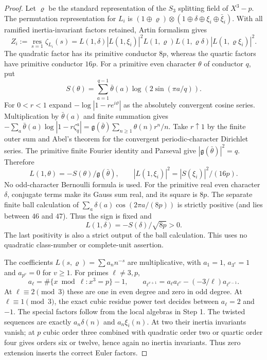 \begin{proof}
Let $\varrho$ be the standard representation of the $S_3$ splitting
field of $X^3-p$.  The permutation representation for $L_i$ is
$(1\oplus\varrho)\otimes(1\oplus\delta\oplus\xi_i\oplus\bar\xi_i)$.
With all ramified inertia-invariant factors retained, Artin formalism gives
\[
 Z_i:=\operatorname*{res}_{s=1}\zeta_{L_i}(s)
 =L(1,\delta)|L(1,\xi_i)|^2
 L(1,\varrho)L(1,\varrho\delta)|L(1,\varrho\xi_i)|^2.
 \tag{G147C.17}
\]
The quadratic factor has its primitive conductor $8p$, whereas the
quartic factors have primitive conductor $16p$.
For a primitive even character $\theta$ of conductor $q$, put
\[
 S(\theta)=\sum_{a=1}^{q-1}\bar\theta(a)
                 \log(2\sin(\pi a/q)).
 \tag{G147C.18}
\]
For $0<r<1$ expand $-\log|1-re^{i\vartheta}|$
as the absolutely convergent cosine series.
Multiplication by $\bar\theta(a)$ and finite summation gives
$-\sum_a\bar\theta(a)\log|1-r\zeta_q^a|
=\mathfrak g(\bar\theta)\sum_{n\ge1}\theta(n)r^n/n$.
Take $r\uparrow1$ by the finite outer sum and Abel's theorem
for the convergent periodic-character Dirichlet series.
The primitive finite Fourier identity and Parseval give
$|\mathfrak g(\bar\theta)|^2=q$.  Therefore
\[
 L(1,\theta)=-S(\theta)/\mathfrak g(\bar\theta),\qquad
 |L(1,\xi_i)|^2=|S(\xi_i)|^2/(16p).
 \tag{G147C.19}
\]
No odd-character Bernoulli formula is used.
For the primitive real even character $\delta$, conjugate terms
make its Gauss sum real, and its square is $8p$.
The separate finite ball calculation of
$\sum_a\delta(a)\cos(2\pi a/(8p))$ is strictly positive
(and lies between $46$ and $47$).  Thus the sign is fixed and
\[
 L(1,\delta)=-S(\delta)/\sqrt{8p}>0.
 \tag{G147C.20}
\]
The last positivity is also a strict output of the ball calculation.
This uses no quadratic class-number or complete-unit assertion.

The coefficients $L(s,\varrho)=\sum a_n n^{-s}$ are multiplicative,
with $a_1=1$, $a_{3^v}=1$ and $a_{p^v}=0$ for $v\ge1$.
For primes $\ell\ne3,p$,
\[
 a_\ell=\#\{x\bmod\ell:x^3=p\}-1,\qquad
 a_{\ell^{v+1}}=a_\ell a_{\ell^v}-(-3/\ell)a_{\ell^{v-1}}.
 \tag{G147C.21}
\]
At $\ell\equiv2\pmod3$ these are one in even degree and zero
in odd degree.  At $\ell\equiv1\pmod3$, the exact cubic residue
power test decides between $a_\ell=2$ and $-1$.
The special factors follow from the local algebras in Step 1.
The twisted sequences are exactly $a_n\delta(n)$ and $a_n\xi_i(n)$.
At two their inertia invariants vanish; at $p$ cubic order three
combined with quadratic order two or quartic order four gives
orders six or twelve, hence again no inertia invariants.
Thus zero extension inserts the correct Euler factors.


\end{proof}

